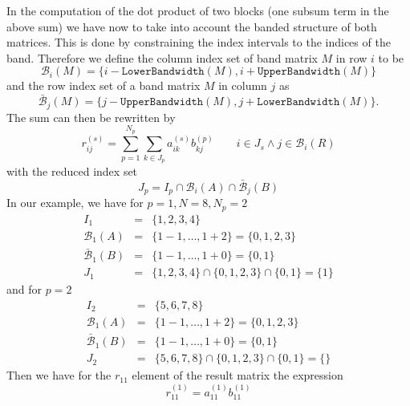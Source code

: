 In the computation of the dot product of two blocks (one subsum term in the
above sum) we have now to take into account the banded structure of
both matrices. This is done by constraining the index intervals to the
indices of the band. Therefore we define the column index set of band
matrix $M$ in row $i$ to be
\begin{equation}
  \label{eq:colindexset}
  \mathcal{B}_i(M)=\{i-\mathtt{LowerBandwidth}(M),i+\mathtt{UpperBandwidth}(M)\}
\end{equation}
and the row index set of a band matrix $M$ in column $j$ as
\begin{equation}
  \label{eq:rowindexset}
  \bar{\mathcal{B}}_j(M)=\{j-\mathtt{UpperBandwidth}(M),j+\mathtt{LowerBandwidth}(M)\}.
\end{equation}
The sum can then be rewritten by
\begin{equation}
  \label{eq:distr_mat}
  r_{ij}^{(s)}=\sum_{p=1}^{N_p}\sum_{k\in J_p} a_{ik}^{(s)}
  b_{kj}^{(p)}\qquad i\in J_s \wedge j\in\mathcal{B}_i(R)
\end{equation}
with the reduced index set
\begin{displaymath}
  J_p=I_p\cap\mathcal{B}_i(A)\cap\bar{\mathcal{B}}_j(B)
\end{displaymath}
In our example, we have for $p=1, N=8, N_p=2$
\begin{eqnarray*}
  I_1&=&\{1,2,3,4\}\\
  \mathcal{B}_1(A) &=& \{1-1,\ldots,1+2\}=\{0,1,2,3\}\\
  \bar{\mathcal{B}}_1(B) &=& \{1-1,\ldots,1+0\}=\{0,1\}\\
  J_1 &=& \{1,2,3,4\}\cap\{0,1,2,3\}\cap\{0,1\}=\{1\}
\end{eqnarray*}
and for $p=2$
\begin{eqnarray*}
  I_2&=&\{5,6,7,8\}\\
  \mathcal{B}_1(A) &=& \{1-1,\ldots,1+2\}=\{0,1,2,3\}\\
  \bar{\mathcal{B}}_1(B) &=& \{1-1,\ldots,1+0\}=\{0,1\}\\
  J_2 &=& \{5,6,7,8\}\cap\{0,1,2,3\}\cap\{0,1\}=\{\}
\end{eqnarray*}
Then we have for the $r_{11}$ element of the result matrix the
expression
\begin{displaymath}
  r_{11}^{(1)}=a_{11}^{(1)}b_{11}^{(1)}
\end{displaymath}

